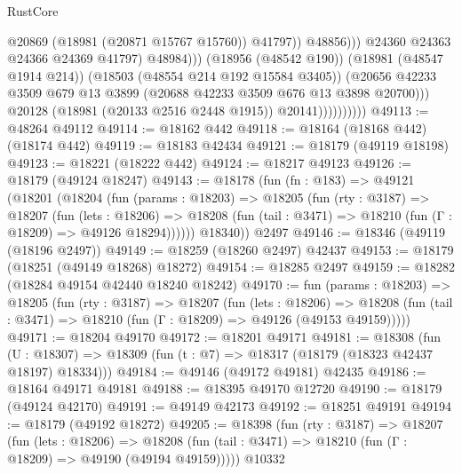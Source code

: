 \begin{lexlean}{RustCore}
\begin{coremodule}
                                            @20869
                                            (@18981 (@20871 @15767 @15760))
                                            @41797))
                                        @48856)))
                                  @24360
                                  @24363
                                  @24366
                                  @24369
                                  @41797)
                                @48984)))
                          (@18956 (@48542 @190))
                          (@18981 (@48547 @1914 @214))
                          (@18503 (@48554 @214 @192 @15584 @3405))
                          (@20656
                            @42233
                            @3509
                            @679
                            @13
                            @3899
                            (@20688 @42233 @3509 @676 @13 @3898 @20700)))
                        @20128
                        (@18981 (@20133 @2516 @2448 @1915))
                        @20141))))))))))
@49113 := @48264 @49112
@49114 := @18162 @442
@49118 := @18164 (@18168 @442) (@18174 @442)
@49119 := @18183 @42434
@49121 := @18179 (@49119 @18198)
@49123 := @18221 (@18222 @442)
@49124 := @18217 @49123
@49126 := @18179 (@49124 @18247)
@49143 := @18178
    (fun (fn : @183) =>
    @49121
      (@18201
        (@18204
          (fun (params : @18203) =>
          @18205
            (fun (rty : @3187) =>
            @18207
              (fun (lets : @18206) =>
              @18208 (fun (tail : @3471) => @18210 (fun (Γ : @18209) => @49126 @18294))))))
        @18340))
    @2497
@49146 := @18346 (@49119 (@18196 @2497))
@49149 := @18259 (@18260 @2497) @42437
@49153 := @18179 (@18251 (@49149 @18268) @18272)
@49154 := @18285 @2497
@49159 := @18282 (@18284 @49154 @42440 @18240 @18242)
@49170 := fun (params : @18203) =>
  @18205
    (fun (rty : @3187) =>
    @18207
      (fun (lets : @18206) =>
      @18208 (fun (tail : @3471) => @18210 (fun (Γ : @18209) => @49126 (@49153 @49159)))))
@49171 := @18204 @49170
@49172 := @18201 @49171
@49181 := @18308
    (fun (U : @18307) => @18309 (fun (t : @7) => @18317 (@18179 (@18323 @42437 @18197) @18334)))
@49184 := @49146 (@49172 @49181) @42435
@49186 := @18164 @49171 @49181
@49188 := @18395 @49170 @12720
@49190 := @18179 (@49124 @42170)
@49191 := @49149 @42173
@49192 := @18251 @49191
@49194 := @18179 (@49192 @18272)
@49205 := @18398
    (fun (rty : @3187) =>
    @18207
      (fun (lets : @18206) =>
      @18208 (fun (tail : @3471) => @18210 (fun (Γ : @18209) => @49190 (@49194 @49159)))))
    @10332

\end{coremodule}
\end{lexlean}
